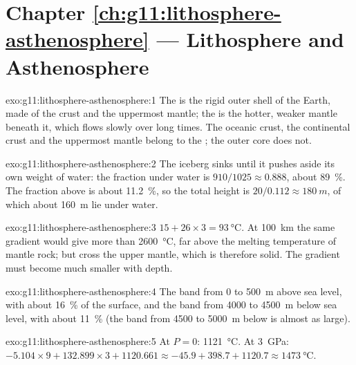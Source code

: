 \section*{Chapter \ref{ch:g11:lithosphere-asthenosphere} --- Lithosphere and Asthenosphere}

\begin{solution}{exo:g11:lithosphere-asthenosphere:1}
The  is the rigid outer shell of the Earth, made of the crust and
the uppermost mantle; the  is the hotter, weaker mantle beneath
it, which flows slowly over long times. The oceanic crust, the continental
crust and the uppermost mantle belong to the ; the outer core does
not.
\end{solution}

\begin{solution}{exo:g11:lithosphere-asthenosphere:2}
The iceberg sinks until it pushes aside its own weight of water: the
fraction under water is $910/1025 \approx 0.888$, about \qty{89}{\percent}.
The fraction above is about \qty{11.2}{\percent}, so the total height is
$20/0.112 \approx \qty{180}{m}$, of which about \qty{160}{m} lie under
water.
\end{solution}

\begin{solution}{exo:g11:lithosphere-asthenosphere:3}
$15 + 26 \times 3 = \qty{93}{\celsius}$. At \qty{100}{km} the same gradient
would give more than \qty{2600}{\celsius}, far above the melting temperature
of mantle rock; but  cross the upper mantle, which is therefore solid.
The gradient must become much smaller with depth.
\end{solution}

\begin{solution}{exo:g11:lithosphere-asthenosphere:4}
The band from 0 to \qty{500}{m} above sea level, with about
\qty{16}{\percent} of the surface, and the band from 4000 to \qty{4500}{m}
below sea level, with about \qty{11}{\percent} (the band from 4500 to
\qty{5000}{m} below is almost as large).
\end{solution}

\begin{solution}{exo:g11:lithosphere-asthenosphere:5}
At $P = 0$: \qty{1121}{\celsius}. At \qty{3}{GPa}: $-5.104 \times 9 +
132.899 \times 3 + 1120.661 \approx -45.9 + 398.7 + 1120.7 \approx
\qty{1473}{\celsius}$.
\end{solution}

